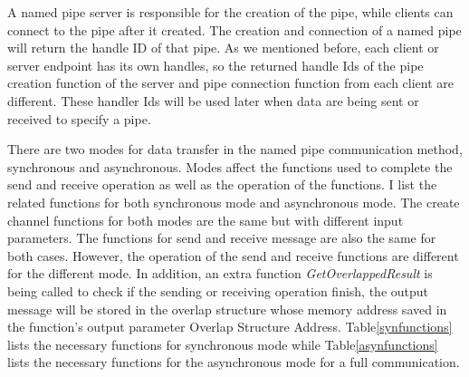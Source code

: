 A named pipe server is responsible for the creation of the pipe, while clients can connect to the pipe after it created. The creation and connection of a named pipe will return the handle ID of that pipe. As we mentioned before, each client or server endpoint has its own handles, so the returned handle Ids of the pipe creation function of the server and pipe connection function from each client are different. These handler Ids will be used later when data are being sent or received to specify a pipe.

There are two modes for data transfer in the named pipe communication method, synchronous and asynchronous.  Modes affect the functions used to complete the send and receive operation as well as the operation of the functions. I list the related functions for both synchronous mode and asynchronous mode. The create channel functions for both modes are the same but with different input parameters. The functions for send and receive message are also the same for both cases. However, the operation of the send and receive functions are different for the different mode. In addition, an extra function \textit{GetOverlappedResult} is being called to check if the sending or receiving operation finish, the output message will be stored in the overlap structure whose memory address saved in the function's output parameter Overlap Structure Address. Table\ref{synfunctions} lists the necessary functions for synchronous mode while Table\ref{asynfunctions} lists the necessary functions for the asynchronous mode for a full communication.

